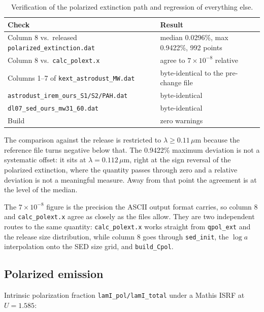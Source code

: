 \documentclass{my_memo}
\newcommand{\code}[1]{\texttt{#1}}
\newcommand{\um}{\ensuremath{\,\mu\mathrm{m}}}
\begin{document}
\begin{table}[h]
\centering
\begin{tabular}{@{}ll@{}}
\toprule
Check & Result \\
\midrule
Column 8 vs.\ released \code{polarized\_extinction.dat} &
median 0.0296\%, max 0.9422\%, 992 points \\
Column 8 vs.\ \code{calc\_polext.x} &
agree to $7\times10^{-8}$ relative \\
Columns 1--7 of \code{kext\_astrodust\_MW.dat} &
byte-identical to the pre-change file \\
\code{astrodust\_irem\_ours\_S1/S2/PAH.dat} &
byte-identical \\
\code{dl07\_sed\_ours\_mw31\_60.dat} &
byte-identical \\
Build & zero warnings \\
\bottomrule
\end{tabular}
\caption{Verification of the polarized extinction path and regression of
everything else.}
\label{tab:verif}
\end{table}

The comparison against the release is restricted to $\lambda \ge 0.11\um$
because the reference file turns negative below that. The 0.9422\% maximum
deviation is not a systematic offset: it sits at $\lambda = 0.112\um$, right at
the sign reversal of the polarized extinction, where the quantity passes
through zero and a relative deviation is not a meaningful measure. Away from
that point the agreement is at the level of the median.

The $7\times10^{-8}$ figure is the precision the ASCII output format carries,
so column 8 and \code{calc\_polext.x} agree as closely as the files allow.
They are two independent routes to the same quantity: \code{calc\_polext.x}
works straight from \code{qpol\_ext} and the release size distribution, while
column 8 goes through \code{sed\_init}, the $\log a$ interpolation onto the SED
size grid, and \code{build\_Cpol}.

\subsection{Polarized emission}

Intrinsic polarization fraction \code{lamI\_pol/lamI\_total} under a Mathis
ISRF at $U = 1.585$:
\end{document}
